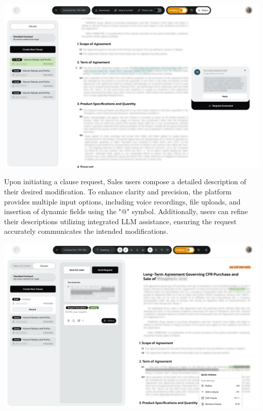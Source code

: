 \begin{center}
    \centering
    \includegraphics[width=1\textwidth]{Images/Clause Requests - Create New Clause from a comment.png}
    \label{fig:create_clause_request_from_comment}
\end{center}

Upon initiating a clause request, Sales users compose a detailed description of their desired modification. To enhance clarity and precision, the platform provides multiple input options, including voice recordings, file uploads, and insertion of dynamic fields using the "@" symbol. Additionally, users can refine their descriptions utilizing integrated LLM assistance, ensuring the request accurately communicates the intended modifications.

\begin{center}
    \centering
    \includegraphics[width=1\textwidth]{Images/Clause Requests - Clause Description.png}
    \label{fig:clause_request_description}
\end{center}

